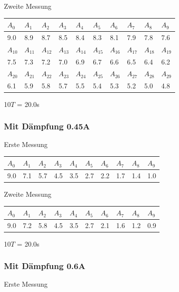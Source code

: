 \documentclass[12pt,a4paper]{article}
\begin{document}
\vspace{10pt}
Zweite Messung

\vspace{3pt}
\begin{tabular}{|l|l|l|l|l|l|l|l|l|l|}
\hline
$A_{0}$&$A_{1}$&$A_{2}$&$A_{3}$&$A_{4}$&$A_{5}$&$A_{6}$&$A_{7}$&$A_{8}$&$A_{9}$\\
\hline
9.0&8.9&8.7&8.5&8.4&8.3&8.1&7.9&7.8&7.6\\
\hline
\hline
$A_{10}$&$A_{11}$&$A_{12}$&$A_{13}$&$A_{14}$&$A_{15}$&$A_{16}$&$A_{17}$&$A_{18}$&$A_{19}$\\
\hline
7.5&7.3&7.2&7.0&6.9&6.7&6.6&6.5&6.4&6.2\\
\hline
\hline
$A_{20}$&$A_{21}$&$A_{22}$&$A_{23}$&$A_{24}$&$A_{25}$&$A_{26}$&$A_{27}$&$A_{28}$&$A_{29}$\\
\hline
6.1&5.9&5.8&5.7&5.5&5.4&5.3&5.2&5.0&4.8\\
\hline
\end{tabular}

\vspace{10pt}
10$T$ = 20.0s

\subsubsection*{Mit D\"ampfung 0.45A}
Erste Messung

\vspace{3pt}
\begin{tabular}{|l|l|l|l|l|l|l|l|l|l|}
\hline
$A_{0}$&$A_{1}$&$A_{2}$&$A_{3}$&$A_{4}$&$A_{5}$&$A_{6}$&$A_{7}$&$A_{8}$&$A_{9}$\\
\hline
9.0&7.1&5.7&4.5&3.5&2.7&2.2&1.7&1.4&1.0\\
\hline
\end{tabular}
\vspace{10pt}

Zweite Messung

\vspace{3pt}
\begin{tabular}{|l|l|l|l|l|l|l|l|l|l|}
\hline
$A_{0}$&$A_{1}$&$A_{2}$&$A_{3}$&$A_{4}$&$A_{5}$&$A_{6}$&$A_{7}$&$A_{8}$&$A_{9}$\\
\hline
9.0&7.2&5.8&4.5&3.5&2.7&2.1&1.6&1.2&0.9\\
\hline
\end{tabular}

\vspace{10pt}
10$T$ = 20.0s

\subsubsection*{Mit D\"ampfung 0.6A}
Erste Messung
\end{document}
